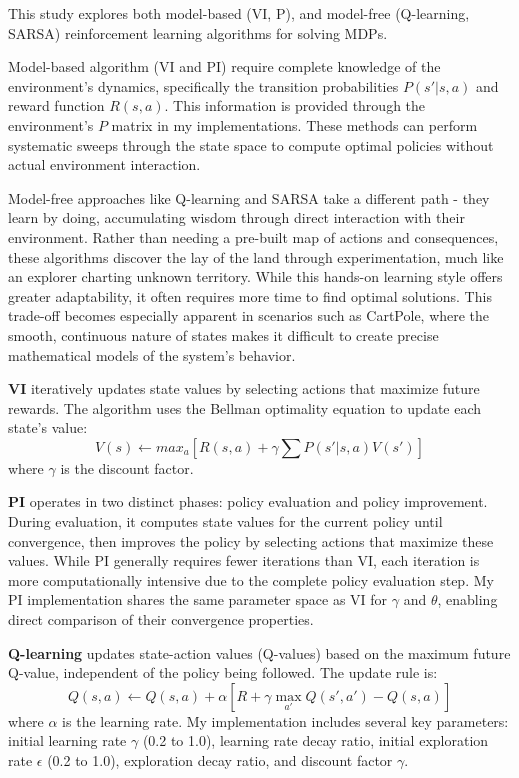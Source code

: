 \documentclass[conference]{IEEEtran}
\begin{document}
This study explores both model-based (VI, P), and model-free (Q-learning,  SARSA) reinforcement learning algorithms for solving MDPs. 

Model-based algorithm (VI and PI) require complete knowledge of the environment's dynamics, specifically the transition probabilities $P(s'|s,a)$ and reward function $R(s,a)$. This information is provided through the environment's $P$ matrix in my implementations. These methods can perform systematic sweeps through the state space to compute optimal policies without actual environment interaction.

Model-free approaches like Q-learning and SARSA take a different path - they learn by doing, accumulating wisdom through direct interaction with their environment. Rather than needing a pre-built map of actions and consequences, these algorithms discover the lay of the land through experimentation, much like an explorer charting unknown territory. While this hands-on learning style offers greater adaptability, it often requires more time to find optimal solutions. This trade-off becomes especially apparent in scenarios such as CartPole, where the smooth, continuous nature of states makes it difficult to create precise mathematical models of the system's behavior.

\textbf{VI} iteratively updates state values by selecting actions that maximize future rewards. The algorithm uses the Bellman optimality equation to update each state's value:
$$V(s) \leftarrow max_a [R(s,a) + \gamma \sum P(s'|s,a)V(s')]$$
where $\gamma$ is the discount factor. 

\textbf{PI} operates in two distinct phases: policy evaluation and policy improvement. During evaluation, it computes state values for the current policy until convergence, then improves the policy by selecting actions that maximize these values. While PI generally requires fewer iterations than VI, each iteration is more computationally intensive due to the complete policy evaluation step. My PI implementation shares the same parameter space as VI for $\gamma$ and $\theta$, enabling direct comparison of their convergence properties.

\textbf{Q-learning} updates state-action values (Q-values) based on the maximum future Q-value, independent of the policy being followed. The update rule is:
$$Q(s,a) \leftarrow Q(s,a) + \alpha[R + \gamma \max_{a'} Q(s',a') - Q(s,a)]$$
where $\alpha$ is the learning rate. My implementation includes several key parameters: initial learning rate $\gamma$ (0.2 to 
1.0), learning rate decay ratio, initial exploration rate $\epsilon$ (0.2 to 1.0), exploration decay ratio, and discount factor $\gamma$.
\end{document}
